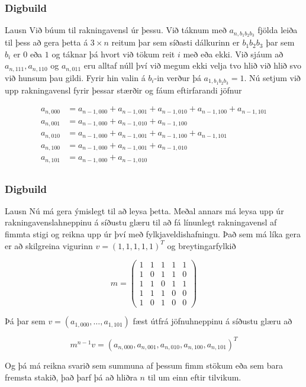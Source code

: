\documentclass{beamer}
\newcommand\p[1]{\left(#1\right)}
\newcommand\env[2]
{
	\begin{#1}
	#2
	\end{#1}
}
\begin{document}
\env{frame}
{
	\frametitle{Digbuild}
	\small
	\env{block}
	{
		{Lausn}
		Við búum til rakningavensl úr þessu. Við táknum með $a_{n, b_1b_2b_3}$ fjölda leiða til þess að gera
		þetta á $3 \times n$ reitum þar sem síðasti dálkurinn er $b_1b_2b_3$ þar sem $b_i$ er $0$ eða $1$ og
		táknar þá hvort við tökum reit $i$ með eða ekki. Við sjáum að $a_{n,111}, a_{n,110}$ og $a_{n,011}$
		eru alltaf núll því við megum ekki velja tvo hlið við hlið svo við hunsum þau gildi. Fyrir hin valin
		á $b_i$-in verður þá $a_{1,b_1b_2b_3} = 1$. Nú setjum við upp rakningavensl fyrir þessar stærðir og
		fáum eftirfarandi jöfnur
		
		\begin{align*}
		a_{n,000} &= a_{n-1,000} + a_{n-1,001} + a_{n-1,010} + a_{n-1,100} + a_{n-1,101} \\
		a_{n,001} &= a_{n-1,000} + a_{n-1,010} + a_{n-1,100} \\
		a_{n,010} &= a_{n-1,000} + a_{n-1,001} + a_{n-1,100} + a_{n-1,101} \\
		a_{n,100} &= a_{n-1,000} + a_{n-1,001} + a_{n-1,010} \\
		a_{n,101} &= a_{n-1,000} + a_{n-1,010} \\
		\end{align*}
	}
}

\env{frame}
{
	\frametitle{Digbuild}
	\small
	\env{block}
	{
		{Lausn}
		Nú má gera ýmislegt til að leysa þetta. Meðal annars má leysa upp úr rakningavenslahneppinu á 
		síðustu glæru til að fá línunlegt rakningavensl af fimmta stigi og reikna upp úr því með
		fylkjaveldishafningu. Það sem má líka gera er að skilgreina vigurinn $v = (1, 1, 1, 1, 1)^T$
		og breytingarfylkið
		
		\begin{scriptsize}
		\[m = \p{\begin{matrix}1&1&1&1&1\\1&0&1&1&0\\1&1&0&1&1\\1&1&1&0&0\\1&0&1&0&0\end{matrix}}\]
		\end{scriptsize}
		
		Þá þar sem $v = (a_{1,000},\dots,a_{1,101})$ fæst útfrá jöfnuhneppinu á síðustu glæru að
		
		\[m^{n-1} v = (a_{n,000},a_{n,001},a_{n,010},a_{n,100},a_{n,101})^T\]
		
		Og þá má reikna svarið sem summuna af þessum fimm stökum eða sem bara fremsta stakið, það
		þarf þá að hliðra $n$ til um einn eftir tilvikum.
	}
}
\end{document}
